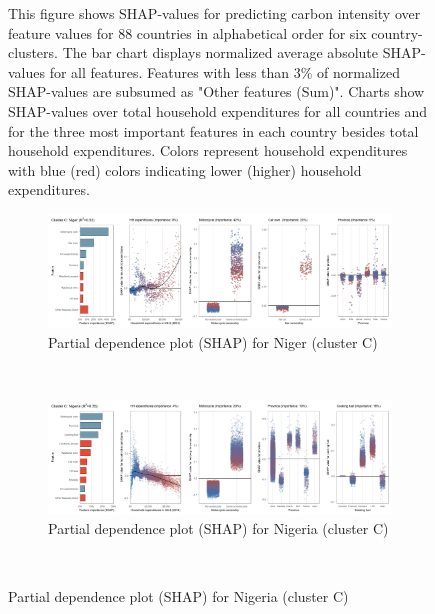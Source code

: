 \begin{figure}[ht!]
    \begin{subcaption2}
     This figure shows SHAP-values for predicting carbon intensity over feature values for 88 countries in alphabetical order for six country-clusters. The bar chart displays normalized average absolute SHAP-values for all features. Features with less than 3\% of normalized SHAP-values are subsumed as "Other features (Sum)". Charts show SHAP-values over total household expenditures for all countries and for the three most important features in each country besides total household expenditures. Colors represent household expenditures with blue (red) colors indicating lower (higher) household expenditures.
     \end{subcaption2}
\end{figure}

\begin{figure}[ht!]\ContinuedFloat
    \centering
   \begin{subfigure}[b]{\textwidth} 
   \centering
         \caption{Partial dependence plot (SHAP) for Niger (cluster C)}
         \label{fig:5b_NER}
         \includegraphics[width=\textwidth]{Figure 5b/Figure_5b_NER}
    \end{subfigure}
    \\
    \vspace{0.5cm}
    \begin{subfigure}[b]{\textwidth}
    \centering
         \caption{Partial dependence plot (SHAP) for Nigeria (cluster C)}
         \label{fig:5b_NGA}
         \includegraphics[width=\textwidth]{Figure 5b/Figure_5b_NGA}    
    \end{subfigure}
    \\

\end{figure}

